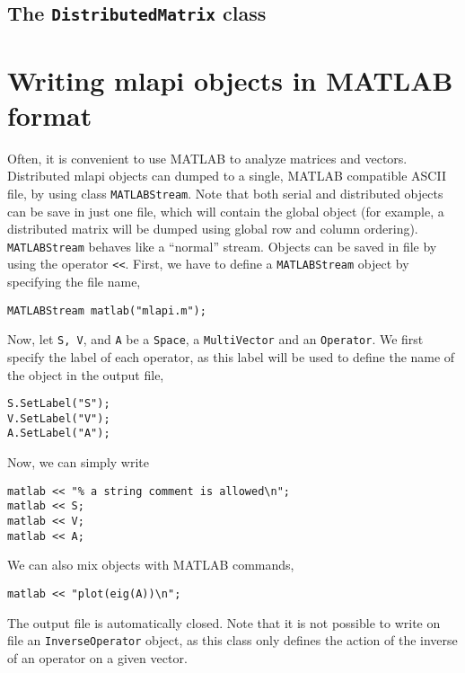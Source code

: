\documentclass{article}[11pt]
\newcommand{\MLAPI}  {{\sc mlapi }}
\begin{document}
\subsection{The {\tt DistributedMatrix} class}
\label{sec:distributedmatrix}

\section{Writing \MLAPI objects in MATLAB format}
\label{sec:matlab}

Often, it is convenient to use MATLAB to analyze matrices and
vectors. Distributed \MLAPI objects can dumped to a single, MATLAB compatible
ASCII file, by using class {\tt MATLABStream}.
Note that both serial and distributed objects 
can be save in just one file, which will contain the global object
(for example, a distributed matrix will be dumped using global row and
 column ordering). {\tt MATLABStream} behaves like a ``normal'' 
stream.  Objects can be saved in file by using the operator \verb!<<!.
First, we have to define a {\tt MATLABStream} object by specifying the
file name,
\begin{verbatim}
MATLABStream matlab("mlapi.m");
\end{verbatim}
Now, let {\tt S, V}, and {\tt A} be a {\tt Space}, a {\tt MultiVector}
and an {\tt Operator}. We first specify the label of each operator, as this
label will be used to define the name of the object in the output file,
\begin{verbatim}
S.SetLabel("S");
V.SetLabel("V");
A.SetLabel("A");
\end{verbatim}
Now, we can simply write
\begin{verbatim}
matlab << "% a string comment is allowed\n";
matlab << S;
matlab << V;
matlab << A;
\end{verbatim}
We can also mix objects with MATLAB commands,
\begin{verbatim}
matlab << "plot(eig(A))\n";
\end{verbatim}
The output file is automatically closed. Note that it is not possible to write
on file an {\tt InverseOperator} object, as this class only defines the
action of the inverse of an operator on a given vector.
\end{document}
